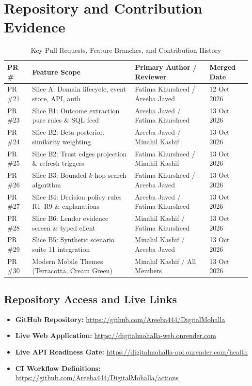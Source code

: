 \chapter{Repository and Contribution Evidence}
\label{app:repository_evidence}

\begin{table}[htbp]
\centering
\caption{Key Pull Requests, Feature Branches, and Contribution History}
\label{tab:pr_history}
\small
\begin{tabularx}{\textwidth}{l p{5cm} p{4cm} l}
\toprule
\textbf{PR \#} & \textbf{Feature Scope} & \textbf{Primary Author / Reviewer} & \textbf{Merged Date} \\
\midrule
PR \#21 & Slice A: Domain lifecycle, event store, API, auth & Fatima Khursheed / Areeba Javed & 12 Oct 2026 \\
PR \#23 & Slice B1: Outcome extraction pure rules \& SQL feed & Areeba Javed / Fatima Khursheed & 13 Oct 2026 \\
PR \#24 & Slice B2: Beta posterior, similarity weighting & Areeba Javed / Minahil Kashif & 13 Oct 2026 \\
PR \#25 & Slice B2: Trust edges projection \& refresh triggers & Fatima Khursheed / Minahil Kashif & 13 Oct 2026 \\
PR \#26 & Slice B3: Bounded $k$-hop search algorithm & Fatima Khursheed / Areeba Javed & 13 Oct 2026 \\
PR \#27 & Slice B4: Decision policy rules R1--R9 \& explanations & Areeba Javed / Fatima Khursheed & 13 Oct 2026 \\
PR \#28 & Slice B6: Lender evidence screen \& typed client & Minahil Kashif / Fatima Khursheed & 13 Oct 2026 \\
PR \#29 & Slice B5: Synthetic scenario suite 11 integration & Minahil Kashif / Areeba Javed & 13 Oct 2026 \\
PR \#30 & Modern Mobile Themes (Terracotta, Cream Green) & Minahil Kashif / All Members & 13 Oct 2026 \\
\bottomrule
\end{tabularx}
\end{table}

\section*{Repository Access and Live Links}
\begin{itemize}
    \item \textbf{GitHub Repository:} \url{https://github.com/Areeba444/DigitalMohalla}
    \item \textbf{Live Web Application:} \url{https://digitalmohalla-web.onrender.com}
    \item \textbf{Live API Readiness Gate:} \url{https://digitalmohalla-api.onrender.com/health}
    \item \textbf{CI Workflow Definitions:} \url{https://github.com/Areeba444/DigitalMohalla/actions}
\end{itemize}
